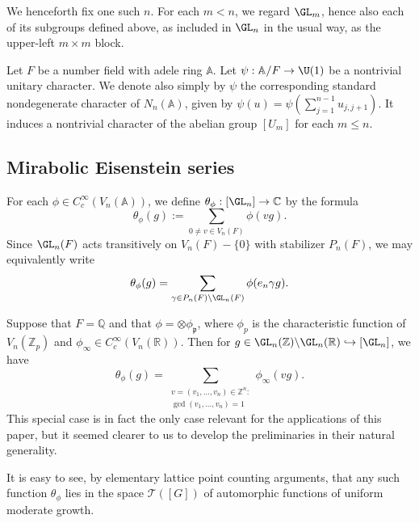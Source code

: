 We henceforth fix one such $n$.  For each $m < n$, we regard $\GL_m$, hence also each of its subgroups defined above, as included in $\GL_n$ in the usual way, as the upper-left $m \times m$ block.

Let $F$ be a number field with adele ring $\mathbb{A}$.  Let $\psi : \mathbb{A}/F \rightarrow \U(1)$ be a nontrivial unitary character.  We denote also simply by $\psi$ the corresponding standard nondegenerate character of $N_n(\mathbb{A})$, given by $\psi(u) = \psi(\sum_{j=1}^{n-1} u_{j,j+1})$.  It induces a nontrivial character of the abelian group $[U_m]$ for each $m \leq n$.

\subsection{Mirabolic Eisenstein series}
For each $\phi \in C_c^\infty(V_n(\mathbb{A}))$, we define $\theta_\phi : [\GL_n] \rightarrow \mathbb{C}$ by the formula
\begin{equation*}
  \theta_\phi(g) := \sum_{0 \neq v \in V_n(F)} \phi(v g).
\end{equation*}
Since $\GL_n(F)$ acts transitively on $V_n(F)-\{0\}$ with stabilizer $P_n(F)$, we may equivalently write
\begin{equation}\label{eq:theta-phi-via-p_n}
  \theta_\phi(g) = \sum_{\gamma \in P_n(F)\backslash \GL_n(F)} \phi(e_n \gamma g).
\end{equation}
\begin{example}
  Suppose that $F = \mathbb{Q}$ and that $\phi = \otimes \phi_\mathfrak{p}$, where $\phi_p$ is the characteristic function of $V_n(\mathbb{Z}_p)$ and $\phi_\infty \in C_c^\infty(V_n(\mathbb{R}))$.  Then for $g \in \GL_n(\mathbb{Z}) \backslash \GL_n(\mathbb{R}) \hookrightarrow [\GL_n]$, we have
  \begin{equation*}
    \theta_\phi(g) =
    \sum_{
      \substack{
        v = (v_1,\dotsc,v_n) \in \mathbb{Z}^n :
        \\
        \gcd(v_1,\dotsc,v_n) = 1
      }
    } \phi_\infty(v g).
  \end{equation*}
  This special case is in fact the only case relevant for the applications of this paper, but it seemed clearer to us to develop the preliminaries in their natural generality.
\end{example}
It is easy to see, by elementary lattice point counting arguments, that any such function $\theta_\phi$ lies in the space $\mathcal{T}([G])$ of automorphic functions of uniform moderate growth.

